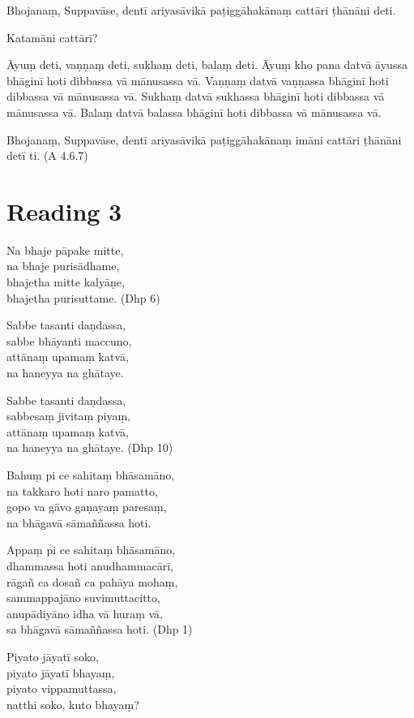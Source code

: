 Bhojanaṃ, Suppavāse, dentī ariyasāvikā paṭiggāhakānaṃ cattāri ṭhānāni deti.

Katamāni cattāri?

Āyuṃ deti, vaṇṇaṃ deti, sukhaṃ deti, balaṃ deti. Āyuṃ kho pana datvā āyussa bhāginī hoti dibbassa vā mānusassa vā. Vaṇṇaṃ datvā vaṇṇassa bhāginī hoti dibbassa vā mānusassa vā. Sukhaṃ datvā sukhassa bhāginī hoti dibbassa vā mānusassa vā. Balaṃ datvā balassa bhāginī hoti dibbassa vā mānusassa vā.

Bhojanaṃ, Suppavāse, dentī ariyasāvikā paṭiggāhakānaṃ imāni cattāri ṭhānāni detī ti. (A 4.6.7)

\section*{Reading 3}

Na bhaje pāpake mitte,\\
na bhaje purisādhame,\\
bhajetha mitte kalyāṇe,\\
bhajetha purisuttame. (Dhp 6)

Sabbe tasanti daṇdassa,\\
sabbe bhāyanti maccuno,\\
attānaṃ upamaṃ katvā,\\
na haneyya na ghātaye.

Sabbe tasanti daṇdassa,\\
sabbesaṃ jīvitaṃ piyaṃ,\\
attānaṃ upamaṃ katvā,\\
na haneyya na ghātaye. (Dhp 10)

Bahuṃ pi ce sahitaṃ bhāsamāno,\\
na takkaro hoti naro pamatto,\\
gopo va gāvo gaṇayaṃ paresaṃ,\\
na bhāgavā sāmaññassa hoti.

Appaṃ pi ce sahitaṃ bhāsamāno,\\
dhammassa hoti anudhammacārī,\\
rāgañ ca dosañ ca pahāya mohaṃ,\\
sammappajāno suvimuttacitto,\\
anupādiyāno idha vā huraṃ vā,\\
sa bhāgavā sāmaññassa hoti. (Dhp 1)

Piyato jāyatī soko,\\
piyato jāyatī bhayaṃ,\\
piyato vippamuttassa,\\
natthi soko, kuto bhayaṃ?

